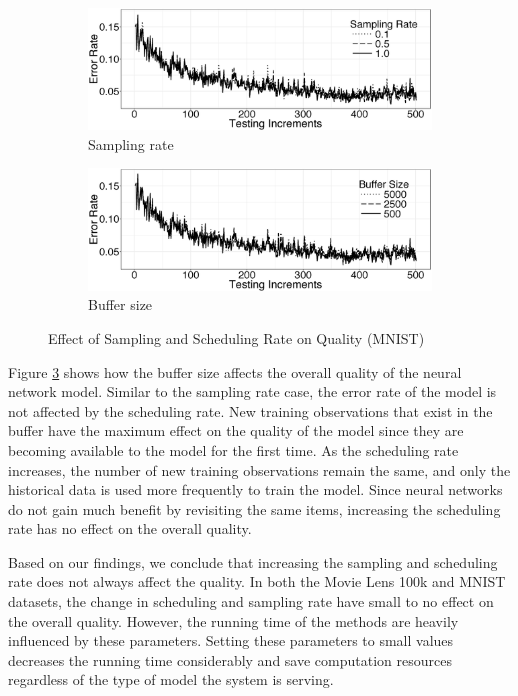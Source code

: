 \documentclass{vldb}
\begin{document}
\begin{figure}[h]
\begin{subfigure}{\columnwidth}
\centering
\includegraphics[width=\columnwidth]{../images/experiment-results/mnist-sampling-improved.eps}
\caption{Sampling rate}
\label{fig:mnist-sample-rate}
\end{subfigure}
\begin{subfigure}{\columnwidth}
\centering
\includegraphics[width=\columnwidth]{../images/experiment-results/mnist-buffersize-improved.eps}
\caption{Buffer size}
\label{fig:mnist-buffer-size}
\end{subfigure}
\vspace{2mm}
\caption{Effect of Sampling and Scheduling Rate on Quality (MNIST)}
\end{figure}

Figure \ref{fig:mnist-buffer-size} shows how the buffer size affects the overall quality of the neural network model.
Similar to the sampling rate case, the error rate of the model is not affected by the scheduling rate.
New training observations that exist in the buffer have the maximum effect on the quality of the model since they are becoming available to the model for the first time.
As the scheduling rate increases, the number of new training observations remain the same, and only the historical data is used more frequently to train the model.
Since neural networks do not gain much benefit by revisiting the same items, increasing the scheduling rate has no effect on the overall quality.

Based on our findings, we conclude that increasing the sampling and scheduling rate does not always affect the quality.
In both the Movie Lens 100k and MNIST datasets, the change in scheduling and sampling rate have small to no effect on the overall quality.
However, the running time of the methods are heavily influenced by these parameters.
Setting these parameters to small values decreases the running time considerably and save computation resources regardless of the type of model the system is serving.
\end{document}
